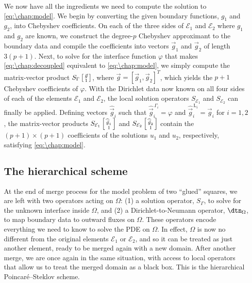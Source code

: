 We now have all the ingredients we need to compute the solution to \cref{eq:\chap:model}. We begin by converting the given boundary functions, $g_1$ and $g_2$, into Chebyshev coefficients. On each of the three sides of $\mathcal{E}_1$ and $\mathcal{E}_2$ where $g_1$ and $g_2$ are known, we construct the degree-$p$ Chebyshev approximant to the boundary data and compile the coefficients into vectors $\vec{g}_1$ and $\vec{g}_2$ of length $3(p+1)$. Next, to solve for the interface function $\varphi$ that makes \cref{eq:\chap:decoupled} equivalent to \cref{eq:\chap:model}, we simply compute the matrix-vector product $S_\Gamma \, \begin{bsmallmatrix} \vec{g} \\ 1 \end{bsmallmatrix}$, where $\vec{g} = [\vec{g}_1, \vec{g}_2]^T$, which yields the $p+1$ Chebyshev coefficients of $\varphi$. With the Dirichlet data now known on all four sides of each of the elements $\mathcal{E}_1$ and $\mathcal{E}_2$, the local solution operators $S_{\mathcal{E}_1}$ and $S_{\mathcal{E}_2}$ can finally be applied. Defining vectors $\widehat{\vec{g}}_i$ such that $\widehat{\vec{g}}_i^{\,\Gamma_i} = \varphi$ and $\widehat{\vec{g}}_i^{\,\mathrm{L}_i} = \vec{g}_i$ for $i=1, 2$, the matrix-vector products $S_{\mathcal{E}_1} \,\begin{bsmallmatrix} \widehat{\vec{g}}_1 \\ 1 \end{bsmallmatrix}$ and $S_{\mathcal{E}_2} \,\begin{bsmallmatrix} \widehat{\vec{g}}_2 \\ 1 \end{bsmallmatrix}$ contain the $(p+1) \times (p+1)$ coefficients of the solutions $u_1$ and $u_2$, respectively, satisfying \cref{eq:\chap:model}.

\subsection{The hierarchical scheme}\label{sec:\chap:ultra_hps}

At the end of merge process for the model problem of two ``glued'' squares, we are left with two operators acting on $\Omega$: (1) a solution operator, $S_\Gamma$, to solve for the unknown interface inside $\Omega$, and (2) a Dirichlet-to-Neumann operator, $\dtn_\Omega$, to map boundary data to outward fluxes on $\Omega$. These operators encode everything we need to know to solve the PDE on $\Omega$. In effect, $\Omega$ is now no different from the original elements $\mathcal{E}_1$ or $\mathcal{E}_2$, and so it can be treated as just another element, ready to be merged again with a new domain. After another merge, we are once again in the same situation, with access to local operators that allow us to treat the merged domain as a black box. This is the hierarchical Poincar\'{e}--Steklov scheme.

